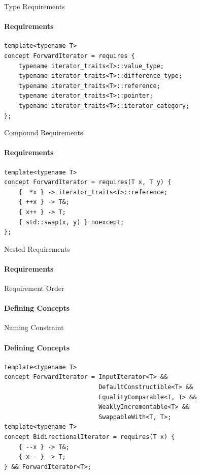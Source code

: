 \documentclass{beamer}
\begin{document}
    \begin{frame}[fragile]{Type Requirements}
        \framesubtitle{Requirements}
        \begin{center}
        \begin{lstlisting}[caption={...}]
template<typename T>
concept ForwardIterator = requires {
    typename iterator_traits<T>::value_type;
    typename iterator_traits<T>::difference_type;
    typename iterator_traits<T>::reference;
    typename iterator_traits<T>::pointer;
    typename iterator_traits<T>::iterator_category;
}; \end{lstlisting}
        \end{center}
    \end{frame}

    \begin{frame}[fragile]{Compound Requirements}
        \framesubtitle{Requirements}
        \begin{center}
        \begin{lstlisting}[caption={...}]
template<typename T>
concept ForwardIterator = requires(T x, T y) {
    {  *x } -> iterator_traits<T>::reference;
    { ++x } -> T&;
    { x++ } -> T;
    { std::swap(x, y) } noexcept;
}; \end{lstlisting}
        \end{center}
    \end{frame}

    \begin{frame}[fragile]{Nested Requirements}
        \framesubtitle{Requirements}
    \end{frame}

    \begin{frame}[fragile]{Requirement Order}
        \framesubtitle{Defining Concepts}
    \end{frame}

    \begin{frame}[fragile]{Naming Constraint}
        \framesubtitle{Defining Concepts}
        \begin{center}
        \begin{lstlisting}[caption={...}]
template<typename T>
concept ForwardIterator = InputIterator<T> &&
                          DefaultConstructible<T> &&
                          EqualityComparable<T, T> &&
                          WeaklyIncrementable<T> &&
                          SwappableWith<T, T>;
template<typename T>
concept BidirectionalIterator = requires(T x) {
    { --x } -> T&;
    { x-- } -> T;
} && ForwardIterator<T>;
\end{lstlisting}
        \end{center}
    \end{frame}
\end{document}
